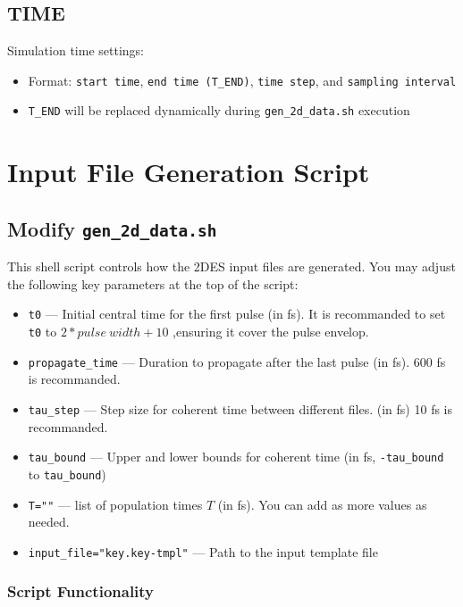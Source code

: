 \documentclass{article}
\begin{document}
\subsection*{TIME}
Simulation time settings:
\begin{itemize}
    \item Format: \texttt{start time}, \texttt{end time (T\_END)}, \texttt{time step}, and \texttt{sampling interval}
    \item \texttt{T\_END} will be replaced dynamically during \texttt{gen\_2d\_data.sh} execution
\end{itemize}

\newpage

\section{Input File Generation Script}

\subsection*{Modify \texttt{gen\_2d\_data.sh}}

This shell script controls how the 2DES input files are generated. You may adjust the following key parameters at the top of the script:

\begin{itemize}
    \item \texttt{t0} — Initial central time for the first pulse (in fs). It is recommanded to set \texttt{t0} to $2 * pulse\ width + 10$ ,ensuring it cover the pulse envelop.
    \item \texttt{propagate\_time} — Duration to propagate after the last pulse (in fs). 600 fs is recommanded.
    \item \texttt{tau\_step} — Step size for coherent time between different files. (in fs) 10 fs is recommanded.
    \item \texttt{tau\_bound} — Upper and lower bounds for coherent time (in fs, \texttt{-tau\_bound} to \texttt{tau\_bound})
    \item \texttt{T=""} — list of population times \(T\) (in fs). You can add as more values as needed.
    \item \texttt{input\_file="key.key-tmpl"} — Path to the input template file
\end{itemize}

\subsubsection*{Script Functionality}
\end{document}
